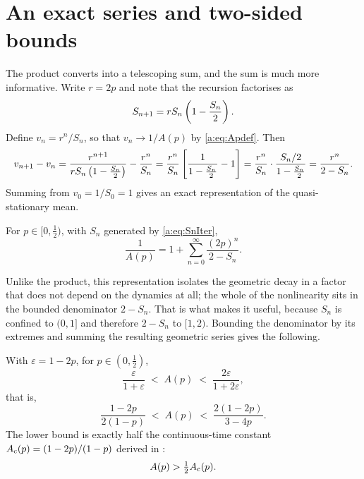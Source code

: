 \section{An exact series and two-sided bounds}
\label{a:sec:bounds}

The product converts into a telescoping sum, and the sum is much more informative.
Write $r=2p$ and note that the recursion factorises as
\begin{equation*}
S_{n+1} = rS_n\left(1-\frac{S_n}{2}\right) .
\end{equation*}
Define $v_n = r^n/S_n$, so that $v_n\to1/A(p)$ by \cref{a:eq:Apdef}. Then
\begin{equation*}
v_{n+1}-v_n
= \frac{r^{n+1}}{rS_n\left(1-\frac{S_n}{2}\right)} - \frac{r^n}{S_n}
= \frac{r^n}{S_n}\left[\frac{1}{1-\frac{S_n}{2}}-1\right]
= \frac{r^n}{S_n}\cdot\frac{S_n/2}{1-\frac{S_n}{2}}
= \frac{r^n}{2-S_n} .
\end{equation*}
Summing from $v_0 = 1/S_0 = 1$ gives an exact representation of the
quasi-stationary mean.

\begin{proposition}
\label{a:prop:series}
For $p\in[0,\tfrac12)$, with $S_n$ generated by \cref{a:eq:SnIter},
\begin{equation}
\label{a:eq:Aseries}
\frac{1}{A(p)} = 1 + \sum_{n=0}^{\infty}\frac{(2p)^n}{2-S_n} .
\end{equation}
\end{proposition}

\noindent
Unlike the product, this representation isolates the geometric decay in a factor
that does not depend on the dynamics at all; the whole of the nonlinearity sits in
the bounded denominator $2-S_n$. That is what makes it useful, because $S_n$ is
confined to $(0,1]$ and therefore $2-S_n$ to $[1,2)$. Bounding the denominator by
its extremes and summing the resulting geometric series gives the following.

\begin{proposition}
\label{a:prop:bounds}
With $\varepsilon=1-2p$, for $p\in(0,\tfrac12)$,
\begin{equation}
\label{a:eq:Abounds}
\frac{\varepsilon}{1+\varepsilon} \;<\; A(p) \;<\; \frac{2\varepsilon}{1+2\varepsilon},
\end{equation}
that is,
\begin{equation}
\label{a:eq:Aboundsexplicit}
\frac{1-2p}{2(1-p)} \;<\; A(p) \;<\; \frac{2(1-2p)}{3-4p} .
\end{equation}
The lower bound is exactly half the continuous-time constant
$A_{\mathrm{c}}(p)=(1-2p)/(1-p)$ derived in \ChM:
\begin{equation}
\label{a:eq:halfAc}
A(p) > \tfrac12A_{\mathrm{c}}(p) .
\end{equation}
\end{proposition}

